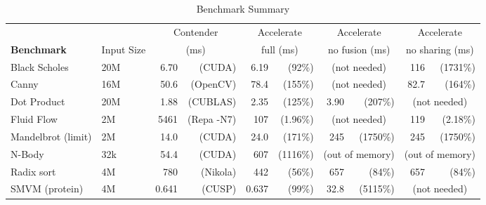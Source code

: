 \begin{table}
\begin{center}
\begin{tabular}{llrrrrrrrr}
\\              &
                & \multicolumn{2}{c}{Contender}
                & \multicolumn{2}{c}{Accelerate}
                & \multicolumn{2}{c}{Accelerate}
                & \multicolumn{2}{c}{Accelerate}
                \\

                  \textbf{Benchmark}
                & Input Size
                & \multicolumn{2}{c}{(ms)}
                & \multicolumn{2}{c}{full (ms)}
                & \multicolumn{2}{c}{no fusion (ms)}
                & \multicolumn{2}{c}{no sharing (ms)}
                \\
\hline
Black Scholes   & 20M
                & 6.70  & (CUDA)
                & 6.19  & (92\%)
                & \multicolumn{2}{c}{(not needed)}
                & 116   & (1731\%)
                \\

Canny           & 16M
                & 50.6  & (OpenCV)
                &  78.4 & (155\%)
                & \multicolumn{2}{c}{(not needed)}
                &  82.7 & (164\%)
                \\

Dot Product     & 20M
                & 1.88  & (CUBLAS)
                & 2.35  & (125\%)
                & 3.90  & (207\%)
                & \multicolumn{2}{c}{(not needed)}
                \\

Fluid Flow      & 2M
                & 5461  & (Repa -N7)
                & 107   & (1.96\%)
                & \multicolumn{2}{c}{(not needed)}
                & 119   & (2.18\%)
                \\

Mandelbrot (limit)
                & 2M
                & 14.0  & (CUDA)
                & 24.0  & (171\%)
                & 245   & (1750\%)
                & 245   & (1750\%)
                \\

N-Body          & 32k
                & 54.4  & (CUDA)
                & 607   & (1116\%)
                & \multicolumn{2}{c}{(out of memory)}
                & \multicolumn{2}{c}{(out of memory)}
                \\

Radix sort      & 4M
                & 780   & (Nikola)
                & 442   & (56\%)
                & 657   & (84\%)
                & 657   & (84\%)
                \\

SMVM (protein)  & 4M
                & 0.641 & (CUSP)
                & 0.637 & (99\%)
                & 32.8  & (5115\%)
                & \multicolumn{2}{c}{(not needed)}

\end{tabular}
\end{center}
\caption{Benchmark Summary}
\label{tab:benchmark-summary}
\end{table}


